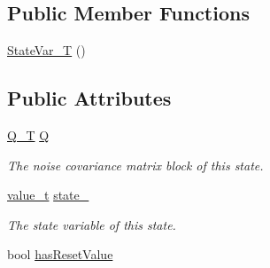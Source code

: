 \subsection*{Public Member Functions}
\begin{DoxyCompactItemize}
\item 
\hyperlink{structmsf__core_1_1StateVar__T_ae0adabbfcabfd1d69885e670acf00b1a}{State\-Var\-\_\-\-T} ()
\end{DoxyCompactItemize}
\subsection*{Public Attributes}
\begin{DoxyCompactItemize}
\item 
\hyperlink{structmsf__core_1_1StateVar__T_a1f30ac85f0fd4307e50fd16377976626}{Q\-\_\-\-T} \hyperlink{structmsf__core_1_1StateVar__T_a618788b64b890837225f9c71c2b81d5d}{Q}
\begin{DoxyCompactList}\small\item\em The noise covariance matrix block of this state. \end{DoxyCompactList}\item 
\hyperlink{structmsf__core_1_1StateVar__T_a4b17a26648ef87fe426df62f973e1b16}{value\-\_\-t} \hyperlink{structmsf__core_1_1StateVar__T_abb101cd9e3e72fad81bad441947579fa}{state\-\_\-}
\begin{DoxyCompactList}\small\item\em The state variable of this state. \end{DoxyCompactList}\item 
bool \hyperlink{structmsf__core_1_1StateVar__T_a60502bb0e8813b19e52dac9dd2a41ab6}{has\-Reset\-Value}
\end{DoxyCompactItemize}


